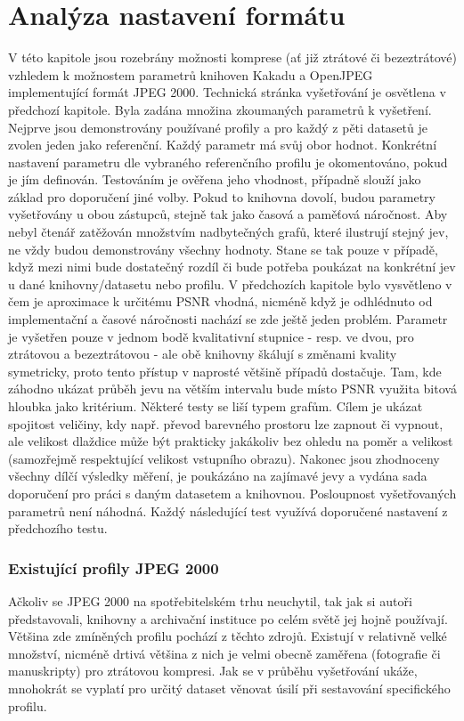 \chapter{Analýza nastavení formátu}
\label{analyza}
V této kapitole jsou rozebrány možnosti komprese (ať již ztrátové či bezeztrátové) vzhledem k možnostem parametrů knihoven Kakadu a OpenJPEG implementující formát JPEG 2000. Technická stránka vyšetřování je osvětlena v předchozí kapitole. Byla zadána množina zkoumaných parametrů k vyšetření. Nejprve jsou demonstrovány používané profily a pro každý z pěti datasetů je zvolen jeden jako referenční. Každý parametr má svůj obor hodnot. Konkrétní nastavení parametru dle vybraného referenčního profilu je okomentováno, pokud je jím definován. Testováním je ověřena jeho vhodnost, případně slouží jako základ pro doporučení jiné volby. Pokud to knihovna dovolí, budou parametry vyšetřovány u obou zástupců, stejně tak jako časová a paměťová náročnost. Aby nebyl čtenář zatěžován množstvím nadbytečných grafů, které ilustrují stejný jev, ne vždy budou demonstrovány všechny hodnoty. Stane se tak pouze v případě, když mezi nimi bude dostatečný rozdíl či bude potřeba poukázat na konkrétní jev u dané knihovny/datasetu nebo profilu.  
V předchozích kapitole bylo vysvětleno v čem je aproximace k určitému PSNR vhodná, nicméně když je odhlédnuto od implementační a časové náročnosti nachází se zde ještě jeden problém. Parametr je vyšetřen pouze v jednom bodě kvalitativní stupnice - resp. ve dvou, pro ztrátovou a bezeztrátovou - ale obě knihovny škálují s změnami kvality symetricky, proto tento přístup v naprosté většině případů dostačuje. Tam, kde záhodno ukázat průběh jevu na větším intervalu bude místo PSNR využita bitová hloubka jako kritérium. Některé testy se liší typem grafům. Cílem je ukázat spojitost veličiny, kdy např. převod barevného prostoru lze zapnout či vypnout, ale velikost dlaždice může být prakticky jakákoliv bez ohledu na poměr a velikost (samozřejmě respektující velikost vstupního obrazu). Nakonec jsou zhodnoceny všechny dílčí výsledky měření, je poukázáno na zajímavé jevy a vydána sada doporučení pro práci s daným datasetem a knihovnou. Posloupnost vyšetřovaných parametrů není náhodná. Každý následující test využívá doporučené nastavení z předchozího testu.

\newpage
\subsection*{Existující profily JPEG 2000}
Ačkoliv se JPEG 2000 na spotřebitelském trhu neuchytil, tak jak si autoři představovali, knihovny a archivační instituce po celém světě jej hojně používají. Většina zde zmíněných profilu pochází z těchto zdrojů. Existují v relativně velké množství, nicméně drtivá většina z nich je velmi obecně zaměřena (fotografie či manuskripty) pro ztrátovou kompresi.  Jak se v průběhu vyšetřování ukáže, mnohokrát se vyplatí pro určitý dataset věnovat úsilí při sestavování specifického profilu.\\

